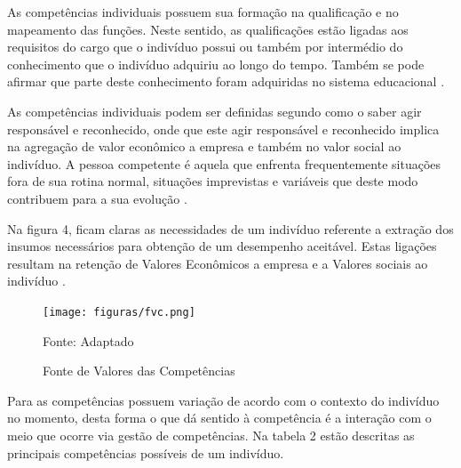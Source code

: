 As competências individuais possuem sua formação na qualificação e no mapeamento das funções. Neste sentido, as qualificações estão ligadas aos requisitos do cargo que o indivíduo possui ou também por intermédio do conhecimento que o indivíduo adquiriu ao longo do tempo. Também se pode afirmar que parte deste conhecimento foram adquiridas no sistema educacional \cite{oliveira2014percepccao}.

As competências individuais podem ser definidas segundo  como o saber agir responsável e reconhecido, onde que este agir responsável e reconhecido implica na agregação de valor econômico a empresa e também no valor social ao indivíduo. A pessoa competente é aquela que enfrenta frequentemente situações fora de sua rotina normal, situações imprevistas e variáveis que deste modo contribuem para a sua evolução \cite{Bergamini2012}.

Na figura 4, ficam claras as necessidades de um indivíduo referente a extração dos insumos necessários para obtenção de um desempenho aceitável. Estas ligações resultam na retenção de Valores Econômicos a empresa e a Valores sociais ao indivíduo \cite{almeida2015certificaccao}.

\begin{figure}[htbp]
	\centering
	\caption{Fonte de Valores das Competências}
	\texttt{[image: figuras/fvc.png]}

	\label{fig:FVC}
	\footnotesize Fonte: Adaptado 
\end{figure}

Para  as competências possuem variação de acordo com o contexto do indivíduo no momento, desta forma o que dá sentido à competência é a interação com o meio que ocorre via gestão de competências. Na tabela 2 estão descritas as principais competências possíveis de um indivíduo.
\vspace{30mm}

